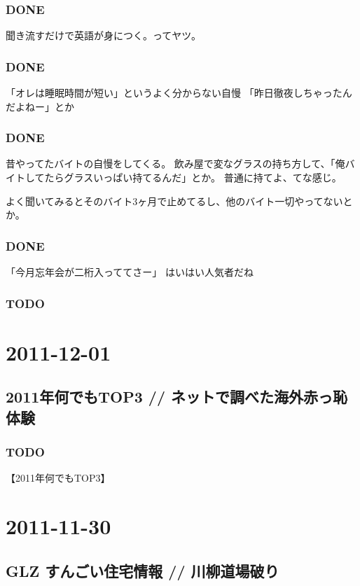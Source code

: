 \documentclass[11pt]{article}
\begin{document}
\subsubsection{\textbf{DONE}}
\label{sec-27_1_2}

聞き流すだけで英語が身につく。ってヤツ。
\subsubsection{\textbf{DONE}}
\label{sec-27_1_3}

「オレは睡眠時間が短い」というよく分からない自慢
「昨日徹夜しちゃったんだよねー」とか
\subsubsection{\textbf{DONE}}
\label{sec-27_1_4}

昔やってたバイトの自慢をしてくる。
飲み屋で変なグラスの持ち方して、「俺バイトしてたらグラスいっぱい持てるんだ」とか。
普通に持てよ、てな感じ。

よく聞いてみるとそのバイト3ヶ月で止めてるし、他のバイト一切やってないとか。
\subsubsection{\textbf{DONE}}
\label{sec-27_1_5}

「今月忘年会が二桁入っててさー」
はいはい人気者だね
\subsubsection{\textbf{TODO}}
\label{sec-27_1_6}
\section{2011-12-01}
\label{sec-28}
\subsection{2011年何でもTOP3 // ネットで調べた海外赤っ恥体験}
\label{sec-28_1}
\subsubsection{\textbf{TODO}}
\label{sec-28_1_1}

【2011年何でもTOP3】
\section{2011-11-30}
\label{sec-29}
\subsection{GLZ すんごい住宅情報 // 川柳道場破り}
\label{sec-29_1}
\end{document}
